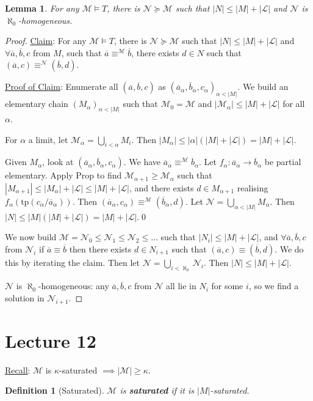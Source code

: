 \documentclass[]{article}
\theoremstyle{custhm}
\theoremstyle{cusdef}
\newtheorem{defin}[theorem]{Definition}
\theoremstyle{custhm}
\newtheorem{lemma}[theorem]{Lemma}
\theoremstyle{custhm}
\theoremstyle{custhm}
\theoremstyle{ex}
\theoremstyle{custhm}
\theoremstyle{cusdef}
\theoremstyle{remark}
\theoremstyle{remark}
\newcommand{\ra}{\rightarrow}
\newcommand{\undf}[1]{\textit{\textbf{#1}}}
\renewcommand{\L}{\mathcal{L}}
\newcommand{\M}{\mathcal{M}}
\renewcommand{\bar}{\overline}
\newcommand{\tp}{\textrm{tp}}
\newcommand{\N}{\mathcal{N}}
\begin{document}
\begin{lemma}
For any $\M\models T$, there is $\N\succeq\M$ such that $|N|\le |M| + |\L|$ and $\N$ is $\aleph_0$-homogeneous.
\end{lemma}
\begin{proof}
\underline{Claim}: For any $\M\models T$, there is $\N\succeq \M$ such that $|N|\le |M|+|\L|$ and $\forall \bar{a},\bar{b},c$ from $M$, such that $\bar{a}\equiv^\M\bar{b}$, there exists $d\in N$ such that $(\bar{a},c) \equiv^\N(\bar{b},d)$.

\underline{Proof of Claim}: Enumerate all $(\bar{a},\bar{b},c)$ as $(\bar{a}_\alpha,\bar{b}_\alpha,c_\alpha)_{\alpha < |M|}$. We build an elementary chain $(M_\alpha)_{\alpha < |M|}$ such that $\M_0 = \M$ and $|\M_\alpha| \le |M| + |\L|$ for all $\alpha$.

For $\alpha$ a limit, let $\M_\alpha = \bigcup_{i<\alpha}M_i$. Then $|M_\alpha| \le |\alpha|(|M|+|\L|) = |M| + |\L|$.

Given $M_\alpha$, look at $(\bar{a}_\alpha,\bar{b}_\alpha,c_\alpha)$. We have $\bar{a}_\alpha \equiv^\M\bar{b}_\alpha$. Let $f_\alpha : \bar{a}_\alpha \ra \bar{b}_\alpha$ be partial elementary. Apply Prop to find $\M_{\alpha+1} \ge \M_\alpha$ such that $|M_{\alpha+1}|\le |M_\alpha| + |\L| \le |M| + |\L|$, and there exists $d \in M_{\alpha+1}$ realising $f_\alpha(\tp(c_\alpha/\bar{a}_\alpha))$. Then $(\bar{a}_\alpha,c_\alpha) \equiv^\M(\bar{b}_\alpha,d)$. Let $\N = \bigcup_{\alpha < |M|}M_\alpha$. Then $|N| \le |M|(|M|+|\L|) = |M| + |\L|$.\qed

We now build $\M = \N_0 \le \N_1\le \N_2\le \dots$ such that $|N_i| \le |M|+|\L|$, and $\forall \bar{a},\bar{b},c$ from $\N_i$ if $\bar{a}\equiv \bar{b}$ then there exists $d\in N_{i+1}$ such that $(\bar{a},c) \equiv (\bar{b},d)$. We do this by iterating the claim. Then let $\N = \bigcup_{i<\aleph_0}\N_i$. Then $|N|\le |M| + |\L|$.

$\N$ is $\aleph_0$-homogeneous: any $\bar{a},\bar{b},c$ from $\N$ all lie in $N_i$ for some $i$, so we find a solution in $\N_{i+1}$.
\end{proof}

\section{Lecture 12}
\underline{Recall}: $\M$ is $\kappa$-saturated $\implies |\M| \ge \kappa$.

\begin{defin}[Saturated]
$\M$ is \undf{saturated} if it is $|M|$-saturated.
\end{defin}
\end{document}
